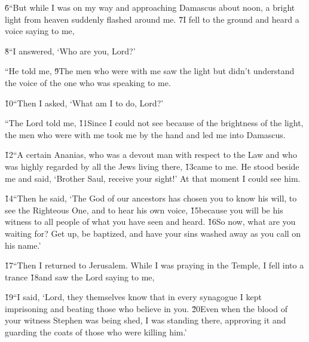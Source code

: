 \v{6}``But while I was on my way and approaching Damascus about noon, a bright light from heaven suddenly flashed around me. \v{7}I fell to the ground and heard a voice saying to me, 

\v{8}``I answered, `Who are you, Lord?'

``He told me,   \v{9}The men who were with me saw the light but didn't understand the voice of the one who was speaking to me.

\v{10}``Then I asked, `What am I to do, Lord?'

``The Lord told me,  \v{11}Since I could not see because of the brightness of the light, the men who were with me took me by the hand and led me into Damascus.

\v{12}``A certain Ananias, who was a devout man with respect to the Law and who was highly regarded by all the Jews living there, \v{13}came to me. He stood beside me and said, `Brother Saul, receive your sight!' At that moment I could see him.

\v{14}``Then he said, `The God of our ancestors has chosen you to know his will, to see the Righteous One, and to hear his own voice, \v{15}because you will be his witness to all people of what you have seen and heard. \v{16}So now, what are you waiting for? Get up, be baptized, and have your sins washed away as you call on his name.'

\v{17}``Then I returned to Jerusalem. While I was praying in the Temple, I fell into a trance \v{18}and saw the Lord saying to me,  

\v{19}``I said, `Lord, they themselves know that in every synagogue I kept imprisoning and beating those who believe in you. \v{20}Even when the blood of your witness Stephen was being shed, I was standing there, approving it and guarding the coats of those who were killing him.'

